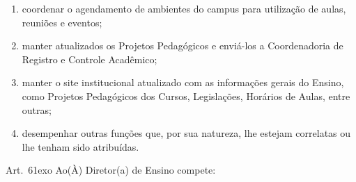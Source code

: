 \documentclass[a4paper,12pt]{report}
\newcommand{\ORD}[2]{#1\raise1ex\hbox{\scriptsize#2}}
\begin{document}
\begin{enumerate}
\item coordenar o agendamento de ambientes do campus para utilização de aulas, reuniões 
      e eventos;

\item manter atualizados os Projetos Pedagógicos e enviá-los a Coordenadoria de Registro 
      e Controle Acadêmico;

\item manter o site institucional atualizado com as informações gerais do Ensino, 
      como Projetos Pedagógicos dos Cursos, Legislações, Horários de Aulas, entre outras;

\item desempenhar outras funções que, por sua natureza, lhe estejam correlatas ou lhe 
      tenham sido atribuídas.
\end{enumerate}
 
Art.~\ORD{6}{o} Ao(À) Diretor(a) de Ensino compete:
\end{document}
